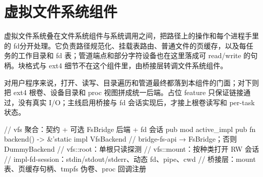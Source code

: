 
\section{虚拟文件系统组件}

虚拟文件系统叠在文件系统组件与系统调用之间，把路径上的操作和每个进程手里的 fd分开处理。它负责路径规范化、挂载表路由、普通文件的页缓存，以及每任务的工作目录和 fd 表；管道端点和部分字符设备也在这里落成可 read/write 的句柄。块格式与 ext4 细节不在这个组件里，由桥接层转调文件系统组件。

对用户程序来说，打开、读写、目录遍历和管道最终都落到本组件的门面；对下则把 ext4 根卷、设备目录和 proc 视图拼成统一后端。占位 feature 只保证链接通过，没有真实 I/O；主线启用桥接与 fd 会话实现后，才接上根卷读写和 per-task 状态。

\begin{rustcode}
// vfs 聚合：契约 + 可选 FsBridge 后端 + fd 会话
pub mod active_impl {
    pub fn backend() -> &'static impl VfsBackend {
        // bridge-fs-api → FsBridge；否则 DummyBackend
    }
}
// vfs::root：单根只读探测
// vfs::mount：按种类打开 RW 会话
// impl-fd-session：stdin/stdout/stderr、动态 fd、pipe、cwd
// 桥接层：mount 表、页缓存句柄、tmpfs 伪卷、proc 回调注册
\end{rustcode}

